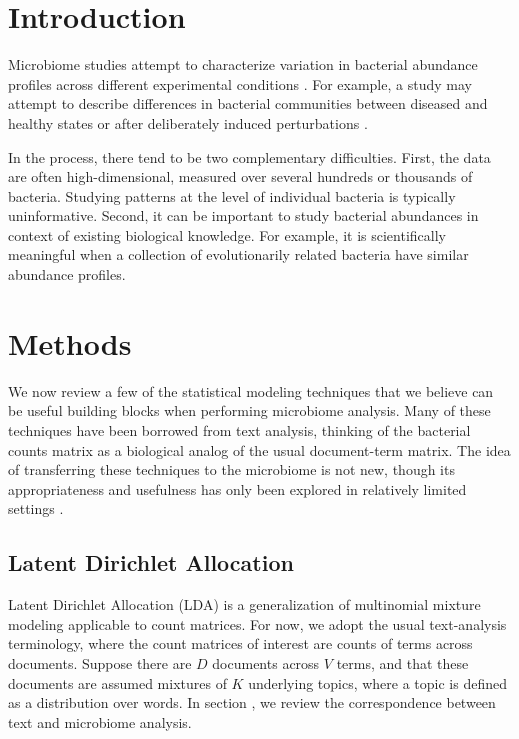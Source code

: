 \documentclass[oupdraft]{bio}
\begin{document}
\section{Introduction}

Microbiome studies attempt to characterize variation in bacterial abundance
profiles across different experimental conditions \citep{human2012structure}.
For example, a study may attempt to describe differences in bacterial
communities between diseased and healthy states or after deliberately induced
perturbations \citep{dethlefsen2011incomplete}.

In the process, there tend to be two complementary difficulties. First, the data
are often high-dimensional, measured over several hundreds or thousands of
bacteria. Studying patterns at the level of individual bacteria is typically
uninformative. Second, it can be important to study bacterial abundances in context
of existing biological knowledge. For example, it is scientifically meaningful
when a collection of evolutionarily related bacteria have similar abundance
profiles.

\section{Methods}

We now review a few of the statistical modeling techniques that we believe can
be useful building blocks when performing microbiome analysis. Many of these
techniques have been borrowed from text analysis, thinking of the bacterial
counts matrix as a biological analog of the usual document-term matrix. The idea
of transferring these techniques to the microbiome is not new, though its
appropriateness and usefulness has only been explored in relatively limited
settings \citep{shafiei2015biomico, chen2012estimating, holmes2012dirichlet,
  chen2013variable}.

\subsection{Latent Dirichlet Allocation}

Latent Dirichlet Allocation (LDA) is a generalization of multinomial mixture
modeling applicable to count matrices. For now, we adopt the usual text-analysis
terminology, where the count matrices of interest are counts of terms across
documents. Suppose there are $D$ documents across $V$ terms, and that these
documents are assumed mixtures of $K$ underlying topics, where a topic is
defined as a distribution over words. In
section \label{sec:microbiome_vs_text_analysis}, we review the correspondence
between text and microbiome analysis.
\end{document}
